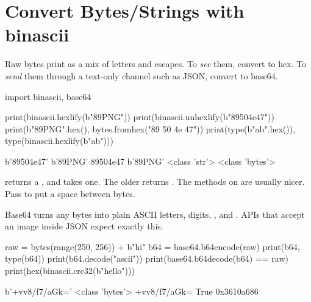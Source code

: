 \section{Convert Bytes/Strings with binascii}

Raw bytes print as a mix of letters and  escapes. To \emph{see} them, convert
to hex. To \emph{send} them through a text-only channel such as JSON, convert to base64.

\begin{pycode}
import binascii, base64

print(binascii.hexlify(b"\x89PNG"))
print(binascii.unhexlify(b"89504e47"))
print(b"\x89PNG".hex(), bytes.fromhex("89 50 4e 47"))
print(type(b"ab".hex()), type(binascii.hexlify(b"ab")))
\end{pycode}
\begin{rawcode}
b'89504e47'
b'\x89PNG'
89504e47 b'\x89PNG'
<class 'str'> <class 'bytes'>
\end{rawcode}

\begin{typecheck}
 returns a , and  takes one. The older
 returns . The methods on  are usually nicer. Pass
 to put a space between bytes.
\end{typecheck}

Base64 turns any bytes into plain ASCII letters, digits, \code{+}, \code{/} and \code{=}. APIs that
accept an image inside JSON expect exactly this.

\begin{pycode}
raw = bytes(range(250, 256)) + b"hi"
b64 = base64.b64encode(raw)
print(b64, type(b64))
print(b64.decode("ascii"))
print(base64.b64decode(b64) == raw)
print(hex(binascii.crc32(b"hello")))
\end{pycode}
\begin{rawcode}
b'+vv8/f7/aGk=' <class 'bytes'>
+vv8/f7/aGk=
True
0x3610a686
\end{rawcode}

\begin{center}
\end{center}

